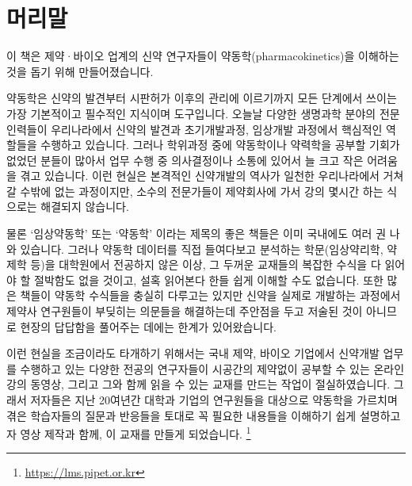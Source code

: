 \documentclass[
  11pt,
  krantz2, a4paper, twoside]{krantz}
\theoremstyle{definition}
\theoremstyle{definition}
\theoremstyle{definition}
\theoremstyle{definition}
\theoremstyle{remark}
\begin{document}
\setlength{\abovedisplayskip}{-5pt}
\setlength{\abovedisplayshortskip}{-5pt}

\newpage\thispagestyle{empty}\null

{
\hypersetup{linkcolor=}
\setcounter{tocdepth}{2}
\tableofcontents
}
\listoffigures
\listoftables
{}
\hypertarget{uxba38uxb9acuxb9d0}{%
\chapter*{머리말}\label{uxba38uxb9acuxb9d0}}


\normalsize

이 책은 제약·바이오 업계의 신약 연구자들이 약동학(pharmacokinetics)을 이해하는 것을 돕기 위해 만들어졌습니다.

  
약동학은 신약의 발견부터 시판허가 이후의 관리에 이르기까지 모든 단계에서 쓰이는 가장 기본적이고 필수적인 지식이며 도구입니다.
오늘날 다양한 생명과학 분야의 전문인력들이 우리나라에서 신약의 발견과 초기개발과정, 임상개발 과정에서 핵심적인 역할들을 수행하고 있습니다.
그러나 학위과정 중에 약동학이나 약력학을 공부할 기회가 없었던 분들이 많아서 업무 수행 중 의사결정이나 소통에 있어서 늘 크고 작은 어려움을 겪고 있습니다.
이런 현실은 본격적인 신약개발의 역사가 일천한 우리나라에서 거쳐갈 수밖에 없는 과정이지만, 소수의 전문가들이 제약회사에 가서 강의 몇시간 하는 식으로는 해결되지 않습니다.

물론 `임상약동학' 또는 `약동학' 이라는 제목의 좋은 책들은 이미 국내에도
여러 권 나와 있습니다. 그러나 약동학 데이터를 직접 들여다보고 분석하는
학문(임상약리학, 약제학 등)을 대학원에서 전공하지 않은 이상, 그 두꺼운 교재들의 복잡한 수식을 다 읽어야 할 절박함도 없을 것이고, 설혹 읽어본다
한들 쉽게 이해할 수도 없습니다.
또한 많은 책들이 약동학 수식들을 충실히
다루고는 있지만 신약을 실제로 개발하는 과정에서 제약사 연구원들이 부딪히는 의문들을 해결하는데 주안점을 두고 저술된 것이 아니므로 현장의 답답함을 풀어주는 데에는 한계가 있어왔습니다.

이런 현실을 조금이라도 타개하기 위해서는 국내 제약, 바이오 기업에서 신약개발 업무를 수행하고 있는 다양한 전공의 연구자들이 시공간의 제약없이 공부할 수 있는 온라인 강의 동영상, 그리고 그와 함께 읽을 수 있는 교재를 만드는 작업이 절실하였습니다.
그래서 저자들은 지난 20여년간 대학과 기업의 연구원들을 대상으로 약동학을 가르치며 겪은 학습자들의 질문과
반응들을 토대로 꼭 필요한 내용들을 이해하기 쉽게 설명하고자 영상 제작과
함께, 이 교재를 만들게 되었습니다. \footnote{\url{https://lms.pipet.or.kr}}
\end{document}
